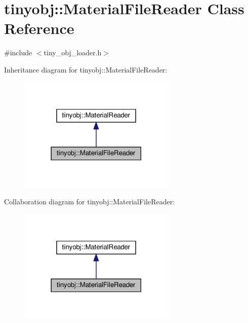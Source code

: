 \hypertarget{classtinyobj_1_1_material_file_reader}{}\section{tinyobj\+:\+:Material\+File\+Reader Class Reference}
\label{classtinyobj_1_1_material_file_reader}


{\ttfamily \#include $<$tiny\+\_\+obj\+\_\+loader.\+h$>$}



Inheritance diagram for tinyobj\+:\+:Material\+File\+Reader\+:\nopagebreak
\begin{figure}[H]
\begin{center}
\leavevmode
\includegraphics[width=213pt]{classtinyobj_1_1_material_file_reader__inherit__graph}
\end{center}
\end{figure}


Collaboration diagram for tinyobj\+:\+:Material\+File\+Reader\+:\nopagebreak
\begin{figure}[H]
\begin{center}
\leavevmode
\includegraphics[width=213pt]{classtinyobj_1_1_material_file_reader__coll__graph}
\end{center}
\end{figure}
